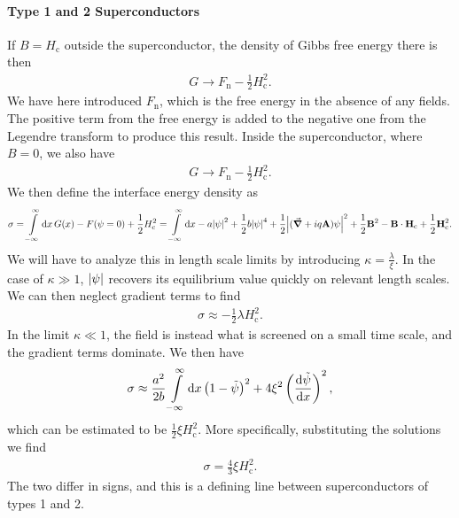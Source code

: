 \paragraph{Type 1 and 2 Superconductors}
If $B = H_{\text{c}}$ outside the superconductor, the density of Gibbs free energy there is then
\begin{align*}
	G \to F_{\text{n}} - \frac{1}{2}H_{\text{c}}^{2}.
\end{align*}
We have here introduced $F_{\text{n}}$, which is the free energy in the absence of any fields. The positive term from the free energy is added to the negative one from the Legendre transform to produce this result. Inside the superconductor, where $B = 0$, we also have
\begin{align*}
	G \to F_{\text{n}} - \frac{1}{2}H_{\text{c}}^{2}.
\end{align*}
We then define the interface energy density as
\begin{align*}
	\sigma = \int\limits_{-\infty}^{\infty}\dd{x}G(x) - F(\psi = 0) + \frac{1}{2}H_{\text{c}}^{2} = \int\limits_{-\infty}^{\infty}\dd{x}-a\abs{\psi}^{2} + \frac{1}{2}b\abs{\psi}^{4} + \frac{1}{2}\abs{(\grad{} + iq\vb{A})\psi}^{2} + \frac{1}{2}\vb{B}^{2} - \vb{B}\cdot\vb{H}_{\text{c}} + \frac{1}{2}\vb{H}_{\text{c}}^{2}.
\end{align*}
We will have to analyze this in length scale limits by introducing $\kappa = \frac{\lambda}{\xi}$. In the case of $\kappa \gg 1$, $\abs{\psi}$ recovers its equilibrium value quickly on relevant length scales. We can then neglect gradient terms to find
\begin{align*}
	\sigma \approx -\frac{1}{2}\lambda H_{\text{c}}^{2}.
\end{align*}
In the limit $\kappa \ll 1$, the field is instead what is screened on a small time scale, and the gradient terms dominate. We then have
\begin{align*}
	\sigma \approx \frac{a^{2}}{2b}\int\limits_{-\infty}^{\infty}\dd{x}\left(1 - \tilde{\psi}\right)^{2} + 4\xi^{2}\left(\dv{\tilde{\psi}}{x}\right)^{2},
\end{align*}
which can be estimated to be $\frac{1}{2}\xi H_{\text{c}}^{2}$. More specifically, substituting the solutions we find
\begin{align*}
	\sigma = \frac{4}{3}\xi H_{\text{c}}^{2}.
\end{align*}
The two differ in signs, and this is a defining line between superconductors of types 1 and 2.

